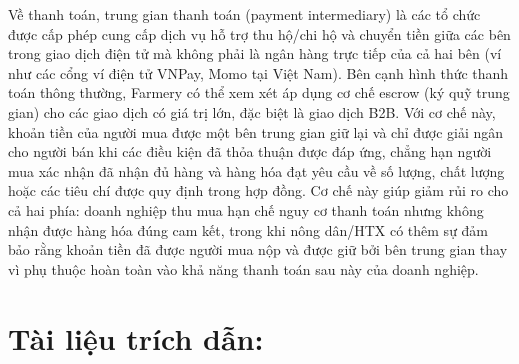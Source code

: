 Về thanh toán, trung gian thanh toán (payment intermediary) là các tổ chức được cấp phép cung cấp dịch vụ hỗ trợ thu hộ/chi hộ và chuyển tiền giữa các bên trong giao dịch điện tử mà không phải là ngân hàng trực tiếp của cả hai bên (ví như các cổng ví điện tử VNPay, Momo tại Việt Nam). Bên cạnh hình thức thanh toán thông thường, Farmery có thể xem xét áp dụng cơ chế escrow (ký quỹ trung gian) cho các giao dịch có giá trị lớn, đặc biệt là giao dịch B2B. Với cơ chế này, khoản tiền của người mua được một bên trung gian giữ lại và chỉ được giải ngân cho người bán khi các điều kiện đã thỏa thuận được đáp ứng, chẳng hạn người mua xác nhận đã nhận đủ hàng và hàng hóa đạt yêu cầu về số lượng, chất lượng hoặc các tiêu chí được quy định trong hợp đồng. Cơ chế này giúp giảm rủi ro cho cả hai phía: doanh nghiệp thu mua hạn chế nguy cơ thanh toán nhưng không nhận được hàng hóa đúng cam kết, trong khi nông dân/HTX có thêm sự đảm bảo rằng khoản tiền đã được người mua nộp và được giữ bởi bên trung gian thay vì phụ thuộc hoàn toàn vào khả năng thanh toán sau này của doanh nghiệp.


\section*{Tài liệu trích dẫn:}


\nocite{*}





